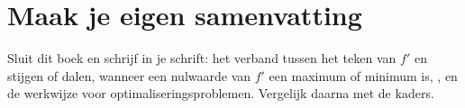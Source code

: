 \ifzelfstudie
\section*{Maak je eigen samenvatting}
Sluit dit boek en schrijf in je schrift: het verband tussen het teken van $f'$ en stijgen of dalen, wanneer een nulwaarde van $f'$ een maximum of minimum is, , en de werkwijze voor optimaliseringsproblemen. Vergelijk daarna met de kaders.
\fi
